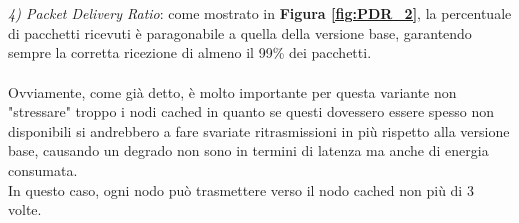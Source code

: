 \\\\
\textit{4) Packet Delivery Ratio}: come mostrato in \textbf{Figura \ref{fig:PDR_2}}, la percentuale di pacchetti ricevuti è paragonabile a quella della versione base, garantendo sempre la corretta ricezione di almeno il 99\% dei pacchetti.
\\\\
Ovviamente, come già detto, è molto importante per questa variante non "stressare" troppo i nodi cached in quanto se questi dovessero essere spesso non disponibili si andrebbero a fare svariate ritrasmissioni in più rispetto alla versione base, causando un degrado non sono in termini di latenza ma anche di energia consumata.\\
In questo caso, ogni nodo può trasmettere verso il nodo cached non più di 3 volte.

